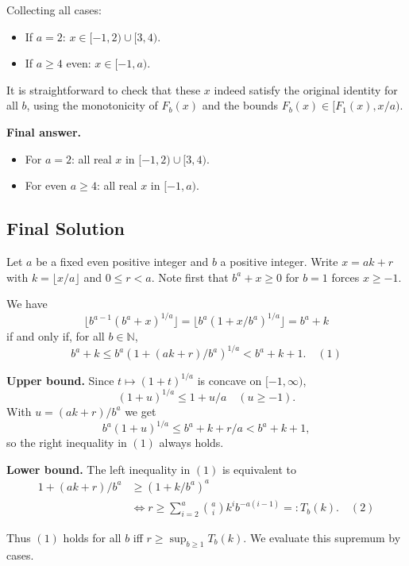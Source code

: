 \documentclass[12pt,a4paper]{article}
\theoremstyle{definition}
\begin{document}
    Collecting all cases:
    \begin{itemize}
        \item If $a = 2$: $x \in [-1, 2) \cup [3, 4)$.
        \item If $a \geq 4$ even: $x \in [-1, a)$.
    \end{itemize}

    It is straightforward to check that these $x$ indeed satisfy the original identity for all $b$, using the monotonicity of $F_b(x)$ and the bounds $F_b(x) \in [F_1(x), x/a)$.

    \textbf{Final answer.}
    \begin{itemize}
        \item For $a = 2$: all real $x$ in $[-1, 2) \cup [3, 4)$.
        \item For even $a \geq 4$: all real $x$ in $[-1, a)$.
    \end{itemize}

    \subsection{Final Solution}
    Let $a$ be a fixed even positive integer and $b$ a positive integer. Write $x = ak + r$ with $k = \lfloor x/a \rfloor$ and $0 \leq r < a$. Note first that $b^a + x \geq 0$ for $b = 1$ forces $x \geq -1$.

    We have
    $$\lfloor b^{a-1}(b^a + x)^{1/a} \rfloor = \lfloor b^a(1 + x/b^a)^{1/a} \rfloor = b^a + k$$
    if and only if, for all $b \in \mathbb{N}$,
    $$b^a + k \leq b^a(1 + (ak + r)/b^a)^{1/a} < b^a + k + 1. \quad (1)$$

    \textbf{Upper bound.} Since $t \mapsto (1 + t)^{1/a}$ is concave on $[-1, \infty)$,
    $$(1 + u)^{1/a} \leq 1 + u/a \quad (u \geq -1).$$
    With $u = (ak + r)/b^a$ we get
    $$b^a(1 + u)^{1/a} \leq b^a + k + r/a < b^a + k + 1,$$
    so the right inequality in $(1)$ always holds.

    \textbf{Lower bound.} The left inequality in $(1)$ is equivalent to
    \begin{align}
        1 + (ak + r)/b^a &\geq (1 + k/b^a)^a \\
        &\Leftrightarrow r \geq \sum_{i=2}^a \binom{a}{i} k^i b^{-a(i-1)} =: T_b(k). \quad (2)
    \end{align}

    Thus $(1)$ holds for all $b$ iff $r \geq \sup_{b \geq 1} T_b(k)$. We evaluate this supremum by cases.
\end{document}
